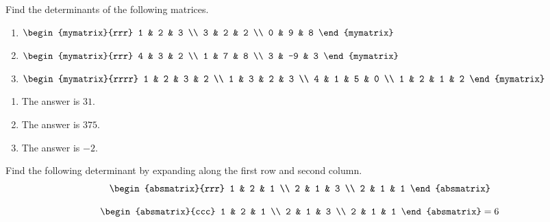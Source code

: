 \begin{enumialphparenastyle}
\begin{ex} Find the determinants of the following matrices.
\begin{enumerate}
\item $\begin{mymatrix}{rrr}
1 & 2 & 3 \\
3 & 2 & 2 \\
0 & 9 & 8
\end{mymatrix} $ 
\item $\begin{mymatrix}{rrr}
4 & 3 & 2 \\
1 & 7 & 8 \\
3 & -9 & 3
\end{mymatrix} $
\item $\begin{mymatrix}{rrrr}
1 & 2 & 3 & 2 \\
1 & 3 & 2 & 3 \\
4 & 1 & 5 & 0 \\
1 & 2 & 1 & 2
\end{mymatrix} $
\end{enumerate}
\begin{sol}
\begin{enumerate}
\item The answer is $31$.
\item The answer is $375$.
\item The answer is $-2$.
\end{enumerate}
\end{sol}
\end{ex}

\begin{ex} Find the following determinant by expanding along the first row and
second column. 
\begin{equation*}
\begin{absmatrix}{rrr}
1 & 2 & 1 \\
2 & 1 & 3 \\
2 & 1 & 1
\end{absmatrix}
\end{equation*}
\begin{sol}
\[
\begin{absmatrix}{ccc}
1 & 2 & 1 \\
2 & 1 & 3 \\
2 & 1 & 1
\end{absmatrix} =  6
\]
\end{sol}
\end{ex}


\end{enumialphparenastyle}
